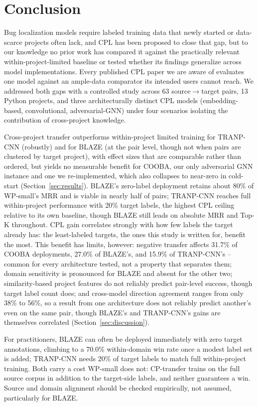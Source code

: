 \documentclass[a4paper,fleqn]{cas-dc}
\begin{document}
\section{Conclusion}
\label{sec:conclusion}

Bug localization models require labeled training data that newly started or
data-scarce projects often lack, and CPL has been proposed to close that gap,
but to our knowledge no prior work has compared it against the practically
relevant within-project-limited baseline or tested whether its findings
generalize across model implementations. Every published CPL paper we are
aware of evaluates one model against an ample-data comparator its intended
users cannot reach. We addressed both gaps with a controlled study across 63
source$\to$target pairs, 13 Python projects, and three architecturally
distinct CPL models (embedding-based, convolutional, adversarial-GNN) under
four scenarios isolating the contribution of cross-project knowledge.

Cross-project transfer outperforms within-project limited training for TRANP-CNN
(robustly) and for BLAZE (at the pair level, though not when pairs are clustered by
target project), with effect sizes that are comparable rather than ordered, but
yields no measurable benefit for COOBA, our only adversarial
GNN instance and one we re-implemented, which also collapses to near-zero in
cold-start (Section~\ref{sec:results}). BLAZE's zero-label deployment retains about
80\% of WP-small's MRR and is
viable in nearly half of pairs;
TRANP-CNN reaches full within-project performance with 20\% target labels, the
highest CPL ceiling relative to its own baseline, though BLAZE still leads on
absolute MRR and Top-K throughout. CPL gain correlates strongly with how few
labels the target already has: the least-labeled targets, the ones this
study is written for, benefit the most. This benefit has limits, however:
negative transfer affects 31.7\% of COOBA deployments, 27.0\% of BLAZE's,
and 15.9\% of TRANP-CNN's -- common for every architecture tested, not a
property that separates them; domain sensitivity is pronounced for BLAZE and
absent for the other two; similarity-based project features do not reliably predict pair-level
success, though target label count does; and cross-model direction agreement
ranges from only 38\% to 56\%, so a result from one architecture does not
reliably predict another's even on the same pair, though BLAZE's and
TRANP-CNN's gains are themselves correlated (Section~\ref{sec:discussion}).

For practitioners, BLAZE can often be deployed immediately with zero target
annotations, climbing to a 70.0\% within-domain win rate once a modest label
set is added; TRANP-CNN needs 20\% of target labels to match full
within-project training. Both carry a cost WP-small does not: CP-transfer
trains on the full source corpus in addition to the target-side labels, and neither guarantees a win. Source and domain alignment should be checked empirically, not
assumed, particularly for BLAZE.
\end{document}
